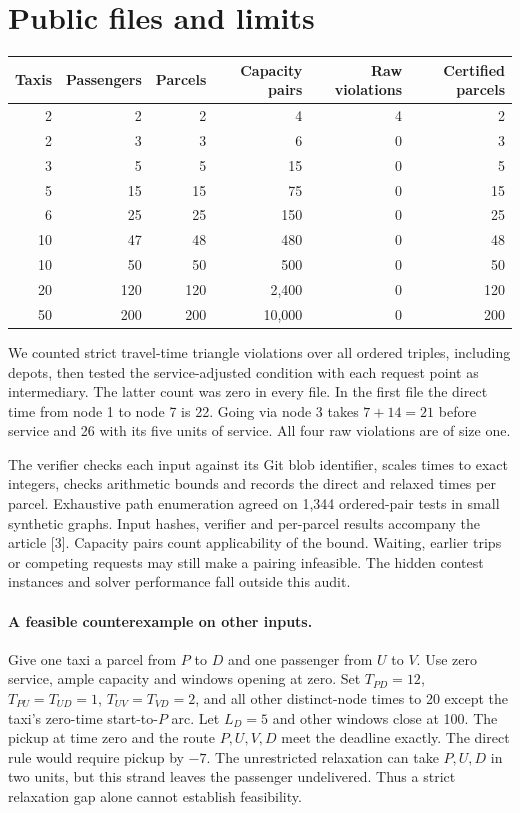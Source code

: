 \documentclass[11pt]{article}
\begin{document}
\section{Public files and limits}
\begin{center}\small
\begin{tabular}{rrrrrr}
\toprule
Taxis & Passengers & Parcels & Capacity pairs & Raw violations & Certified parcels\\
\midrule
2&2&2&4&4&2\\2&3&3&6&0&3\\3&5&5&15&0&5\\5&15&15&75&0&15\\
6&25&25&150&0&25\\10&47&48&480&0&48\\10&50&50&500&0&50\\
20&120&120&2,400&0&120\\50&200&200&10,000&0&200\\
\bottomrule
\end{tabular}
\end{center}
We counted strict travel-time triangle violations over all ordered triples, including depots, then tested the service-adjusted condition with each request point as intermediary. The latter count was zero in every file. In the first file the direct time from node 1 to node 7 is 22. Going via node 3 takes $7+14=21$ before service and 26 with its five units of service. All four raw violations are of size one.

The verifier checks each input against its Git blob identifier, scales times to exact integers, checks arithmetic bounds and records the direct and relaxed times per parcel. Exhaustive path enumeration agreed on 1,344 ordered-pair tests in small synthetic graphs. Input hashes, verifier and per-parcel results accompany the article [3]. Capacity pairs count applicability of the bound. Waiting, earlier trips or competing requests may still make a pairing infeasible. The hidden contest instances and solver performance fall outside this audit.

\paragraph{A feasible counterexample on other inputs.}
Give one taxi a parcel from $P$ to $D$ and one passenger from $U$ to $V$. Use zero service, ample capacity and windows opening at zero. Set $T_{PD}=12$, $T_{PU}=T_{UD}=1$, $T_{UV}=T_{VD}=2$, and all other distinct-node times to 20 except the taxi's zero-time start-to-$P$ arc. Let $L_D=5$ and other windows close at 100. The pickup at time zero and the route $P,U,V,D$ meet the deadline exactly. The direct rule would require pickup by $-7$. The unrestricted relaxation can take $P,U,D$ in two units, but this strand leaves the passenger undelivered. Thus a strict relaxation gap alone cannot establish feasibility.
\end{document}
